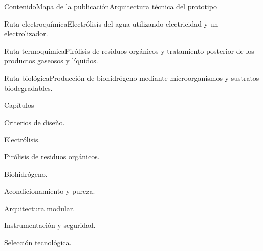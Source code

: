 \begin{HVTPage}{Contenido}{Mapa de la publicación}{Arquitectura técnica del prototipo}
\begin{HVTGrid}
\begin{HVTColumn}{Ruta electroquímica}Electrólisis del agua utilizando electricidad y un electrolizador.\end{HVTColumn}
\begin{HVTColumn}{Ruta termoquímica}Pirólisis de residuos orgánicos y tratamiento posterior de los productos gaseosos y líquidos.\end{HVTColumn}
\begin{HVTColumn}{Ruta biológica}Producción de biohidrógeno mediante microorganismos y sustratos biodegradables.\end{HVTColumn}
\end{HVTGrid}
\begin{HVTTaskOrdered}{Capítulos}\item Criterios de diseño. \item Electrólisis. \item Pirólisis de residuos orgánicos. \item Biohidrógeno. \item Acondicionamiento y pureza. \item Arquitectura modular. \item Instrumentación y seguridad. \item Selección tecnológica.\end{HVTTaskOrdered}
\end{HVTPage}
